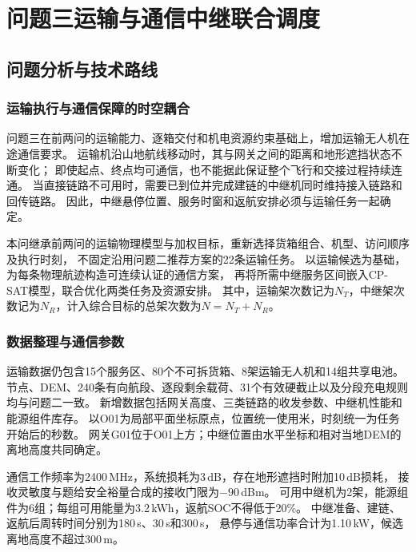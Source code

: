 \begingroup
\providecommand{\qThreeFigDir}{figures/q3}
\captionsetup{font=small,skip=4pt}
\setlength{\textfloatsep}{8pt plus 2pt minus 2pt}
\setlength{\floatsep}{6pt plus 2pt minus 2pt}
\setlength{\intextsep}{8pt plus 2pt minus 2pt}
\setlength{\emergencystretch}{1em}
\section{问题三运输与通信中继联合调度}
\label{sec:problem3}

\subsection{问题分析与技术路线}
\subsubsection{运输执行与通信保障的时空耦合}
问题三在前两问的运输能力、逐箱交付和机电资源约束基础上，增加运输无人机在途通信要求。
运输机沿山地航线移动时，其与网关之间的距离和地形遮挡状态不断变化；
即使起点、终点均可通信，也不能据此保证整个飞行和交接过程持续连通。
当直接链路不可用时，需要已到位并完成建链的中继机同时维持接入链路和回传链路。
因此，中继悬停位置、服务时窗和返航安排必须与运输任务一起确定。

本问继承前两问的运输物理模型与加权目标，重新选择货箱组合、机型、访问顺序及执行时刻，
不固定沿用问题二推荐方案的22条运输任务。
以运输候选为基础，为每条物理航迹构造可连续认证的通信方案，
再将所需中继服务区间嵌入CP-SAT模型，联合优化两类任务及资源安排。
其中，运输架次数记为$N_T$，中继架次数记为$N_R$，计入综合目标的总架次数为$N=N_T+N_R$。

\subsubsection{数据整理与通信参数}
运输数据仍包含15个服务区、80个不可拆货箱、8架运输无人机和14组共享电池。
节点、DEM、240条有向航段、逐段剩余载荷、31个有效硬截止以及分段充电规则均与问题二一致。
新增数据包括网关高度、三类链路的收发参数、中继机性能和能源组件库存。
以O01为局部平面坐标原点，位置统一使用米，时刻统一为任务开始后的秒数。
网关G01位于O01上方；中继位置由水平坐标和相对当地DEM的离地高度共同确定。

通信工作频率为2400\,MHz，系统损耗为3\,dB，存在地形遮挡时附加10\,dB损耗，
接收灵敏度与题给安全裕量合成的接收门限为$-90$\,dBm。
可用中继机为2架，能源组件为6组；每组可用能量为3.2\,kWh，返航SOC不得低于20\%。
中继准备、建链、返航后周转时间分别为180\,s、30\,s和300\,s，
悬停与通信功率合计为1.10\,kW，候选离地高度不超过300\,m。

